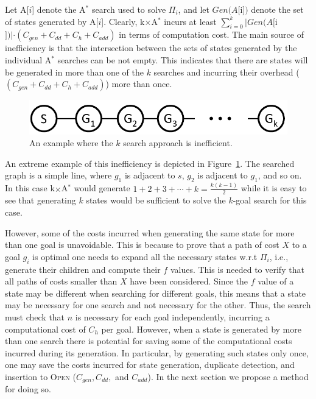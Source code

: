 \documentclass{aicom2e}
\newcommand{\kgs}{$k$-goal search}
\newcommand{\astar}{A$^*$}
\newcommand{\kxastar}{k$\times$A$^*$}
\newcommand{\astari}[1]{A[$#1$]}
\newcommand{\open}{\textsc{Open}}
\begin{document}
Let \astari{i} denote the \astar{} search used to solve $\Pi_i$, and let $Gen(\astari{i})$ denote the set of states generated by \astari{i}.   
Clearly, \kxastar{} incurs at least $\sum_{i=0}^k |Gen(\astari{i})|\cdot(C_{gen}+C_{dd}+C_{h}+C_{add})$ in terms of computation cost. 
The main source of inefficiency is that the intersection between 
the sets of states generated by the individual \astar{} searches can be not empty. This indicates that there are states will be generated in more than one of the $k$ searches and incurring their overhead ($(C_{gen}+C_{dd}+C_{h}+C_{add})$) more than once.

\begin{figure}
	\includegraphics[width=\columnwidth]{k-search-bad_cropped}
	\caption{An example where the $k$ search approach is inefficient.}
	\label{fig:k-search-bad}
\end{figure}
An extreme example of this inefficiency is depicted in Figure~\ref{fig:k-search-bad}. The searched graph is a simple line, 
where $g_1$ is adjacent to $s$, $g_2$ is adjacent to $g_1$, and so on. In this case \kxastar{} would generate
$1+2+3+\cdots+k=\frac{k(k-1)}{2}$ while it is easy to see that generating $k$ states would be sufficient to solve the \kgs{} for this case. 


However, some of the costs incurred when generating the same state for more than one goal is unavoidable. 
This is because to prove that a path of cost $X$ to a goal $g_i$ is optimal one needs to expand all the necessary states w.r.t $\Pi_i$, 
i.e., generate their children and compute their $f$ values. This is needed to verify that all paths of costs smaller than $X$ have been considered. Since the $f$ value of a state may be different when searching for different goals, this means that a state may be necessary for one search and not necessary for the other. 
Thus, the search must check that $n$ is necessary for each goal independently, incurring a computational cost of $C_{h}$ per goal. 
However, when a state is generated by more than one search there is potential for saving some of the computational costs incurred during its generation. In particular, by generating such states only once, one may save the costs incurred for state generation, duplicate detection, and insertion to \open{} ($C_{gen}, C_{dd},$ and $C_{add}$). In the next section we propose a method for doing so. 
\end{document}
